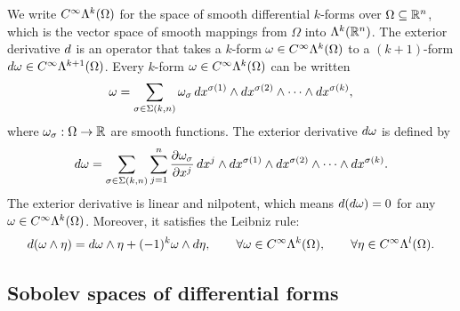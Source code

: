 \documentclass[10pt,letterpaper]{article}
\newcommand\cye[1]{%
  \protect\leavevmode
  \begingroup
    \color{red!35!yellow}%
    #1%
  \endgroup
}
\begin{document}
We write $C^{\infty}\Lambda^{k}(\Omega)$ for the space of smooth differential $k$-forms over $\Omega \subseteq {\mathbb R}^{n}$,
which is the vector space of smooth mappings from $\Omega$ into $\Lambda^{k}({\mathbb R}^{n})$.
The exterior derivative \( d \) is an operator that takes a \( k \)-form \( \omega \in C^{\infty}\Lambda^{k}(\Omega) \) 
to a \((k+1)\)-form \( d\omega \in C^{\infty}\Lambda^{k+1}(\Omega) \). 
Every \( k \)-form \( \omega \in C^{\infty}\Lambda^{k}(\Omega) \) can be written 
\begin{gather*}
    \omega = 
    \sum_{ \sigma \in \Sigma(k,n) } 
    \omega_{\sigma} \, 
    dx^{\sigma(1)} \wedge dx^{\sigma(2)} \wedge \cdots \wedge dx^{\sigma(k)},
\end{gather*}
where \( \omega_{\sigma} : \Omega \rightarrow {\mathbb R} \) are smooth functions.
The exterior derivative \( d\omega \) is defined by
\begin{gather*}
    d\omega = 
    \sum_{ \sigma \in \Sigma(k,n) } 
    \sum_{j=1}^{n} 
    \frac{\partial \omega_{\sigma}}{\partial x^j} 
    \, dx^j \wedge 
    dx^{\sigma(1)} \wedge dx^{\sigma(2)} \wedge \cdots \wedge dx^{\sigma(k)}.
\end{gather*}
The exterior derivative is linear and nilpotent, which means 
\( d(d\omega) = 0 \) for any \( \omega \in C^{\infty}\Lambda^{k}(\Omega) \).
Moreover, it satisfies the Leibniz rule:
\begin{gather*} 
    d(\omega \wedge \eta) 
    = 
    d\omega \wedge \eta + (-1)^{k} \omega \wedge d\eta, 
    \qquad \forall \omega \in C^{\infty}\Lambda^{k}(\Omega), 
    \qquad \forall \eta \in C^{\infty}\Lambda^{l}(\Omega).
\end{gather*}

\subsection{\cye{Sobolev spaces of differential forms}}
\end{document}
